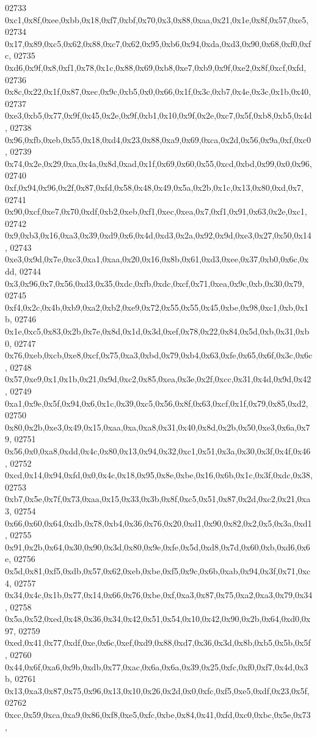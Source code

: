 \begin{DoxyCode}
02733   0xc1,0x8f,0xee,0xbb,0x18,0xf7,0xbf,0x70,0x3,0x88,0xaa,0x21,0x1e,0x8f,0x57,0xe5,
02734   0x17,0x89,0xc5,0x62,0x88,0xc7,0x62,0x95,0xb6,0x94,0xda,0xd3,0x90,0x68,0xf0,0xfc,
02735   0xd6,0x9f,0x8,0xf1,0x78,0x1c,0x88,0x69,0xb8,0xe7,0xb9,0x9f,0xe2,0x8f,0xcf,0xfd,
02736   0x8c,0x22,0x1f,0x87,0xec,0x9c,0xb5,0x0,0x66,0x1f,0x3c,0xb7,0x4e,0x3c,0x1b,0x40,
02737   0xe3,0xb5,0x77,0x9f,0x45,0x2e,0x9f,0xb1,0x10,0x9f,0x2e,0xc7,0x5f,0xb8,0xb5,0x4d,
02738   0x96,0xfb,0xeb,0x55,0x18,0xd4,0x23,0x88,0xa9,0x69,0xca,0x2d,0x56,0x9a,0xf,0xc0,
02739   0x74,0x2e,0x29,0xa,0x4a,0x8d,0xad,0x1f,0x69,0x60,0x55,0xcd,0xbd,0x99,0x0,0x96,
02740   0xf,0x94,0x96,0x2f,0x87,0xfd,0x58,0x48,0x49,0x5a,0x2b,0x1c,0x13,0x80,0xd,0x7,
02741   0x90,0xcf,0xe7,0x70,0xdf,0xb2,0xeb,0xf1,0xec,0xea,0x7,0xf1,0x91,0x63,0x2e,0xc1,
02742   0x9,0xb3,0x16,0xa3,0x39,0xd9,0x6,0x4d,0xd3,0x2a,0x92,0x9d,0xe3,0x27,0x50,0x14,
02743   0xe3,0x9d,0x7e,0xc3,0xa1,0xaa,0x20,0x16,0x8b,0x61,0xd3,0xee,0x37,0xb0,0x6c,0xdd,
02744   0x3,0x96,0x7,0x56,0xd3,0x35,0xdc,0xfb,0xdc,0xcf,0x71,0xea,0x9c,0xb,0x30,0x79,
02745   0xf4,0x2c,0x4b,0xb9,0xa2,0xb2,0xe9,0x72,0x55,0x55,0x45,0xbe,0x98,0xc1,0xb,0x1b,
02746   0x1e,0xc5,0x83,0x2b,0x7e,0x8d,0x1d,0x3d,0xef,0x78,0x22,0x84,0x5d,0xb,0x31,0xb0,
02747   0x76,0xeb,0xcb,0xe8,0xcf,0x75,0xa3,0xbd,0x79,0xb4,0x63,0xfe,0x65,0x6f,0x3c,0x6c,
02748   0x57,0xe9,0x1,0x1b,0x21,0x9d,0xc2,0x85,0xea,0x3e,0x2f,0xcc,0x31,0x4d,0x9d,0x42,
02749   0xa1,0x9e,0x5f,0x94,0x6,0x1c,0x39,0xc5,0x56,0x8f,0x63,0xcf,0x1f,0x79,0x85,0xd2,
02750   0x80,0x2b,0xe3,0x49,0x15,0xaa,0xa,0xa8,0x31,0x40,0x8d,0x2b,0x50,0xe3,0x6a,0x79,
02751   0x56,0x0,0xa8,0xdd,0x4c,0x80,0x13,0x94,0x32,0xc1,0x51,0x3a,0x30,0x3f,0x4f,0x46,
02752   0xcd,0x14,0x94,0xfd,0x0,0x4c,0x18,0x95,0x8e,0xbe,0x16,0x6b,0x1c,0x3f,0xdc,0x38,
02753   0xb7,0x5e,0x7f,0x73,0xaa,0x15,0x33,0x3b,0x8f,0xc5,0x51,0x87,0x2d,0xc2,0x21,0xa3,
02754   0x66,0x60,0x64,0xdb,0x78,0xb4,0x36,0x76,0x20,0xd1,0x90,0x82,0x2,0x5,0x3a,0xd1,
02755   0x91,0x2b,0x64,0x30,0x90,0x3d,0x80,0x9e,0xfe,0x5d,0xd8,0x7d,0x60,0xb,0xd6,0x6e,
02756   0x5d,0x81,0xf5,0xdb,0x57,0x62,0xeb,0xbe,0xf5,0x9c,0x6b,0xab,0x94,0x3f,0x71,0xc4,
02757   0x34,0x4c,0x1b,0x77,0x14,0x66,0x76,0xbe,0xf,0xa3,0x87,0x75,0xa2,0xa3,0x79,0x34,
02758   0x5a,0x52,0xed,0x48,0x36,0x34,0x42,0x51,0x54,0x10,0x42,0x90,0x2b,0x64,0xd0,0x97,
02759   0xed,0x41,0x77,0xdf,0xe,0x6c,0xef,0xd9,0x88,0xd7,0x36,0x3d,0x8b,0xb5,0x5b,0x5f,
02760   0x44,0x6f,0xa6,0x9b,0xdb,0x77,0xac,0x6a,0x6a,0x39,0x25,0xfc,0xf0,0xf7,0x4d,0x3b,
02761   0x13,0xa3,0x87,0x75,0x96,0x13,0x10,0x26,0x2d,0x0,0xfc,0xf5,0xe5,0xdf,0x23,0x5f,
02762   0xcc,0x59,0xca,0xa9,0x86,0xf8,0xe5,0xfc,0xbe,0x84,0x41,0xfd,0xc0,0xbc,0x5e,0x73,

\end{DoxyCode}
